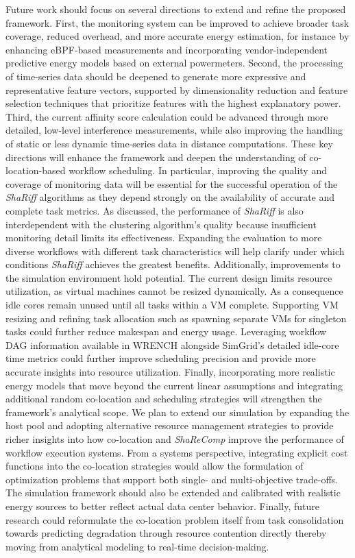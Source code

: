 Future work should focus on several directions to extend and refine the proposed framework. First, the monitoring system can be improved to achieve broader task coverage, reduced overhead, and more accurate energy estimation, for instance by enhancing eBPF-based measurements and incorporating vendor-independent predictive energy models based on external powermeters. Second, the processing of time-series data should be deepened to generate more expressive and representative feature vectors, supported by dimensionality reduction and feature selection techniques that prioritize features with the highest explanatory power.
Third, the current affinity score calculation could be advanced through more detailed, low-level interference measurements, while also improving the handling of static or less dynamic time-series data in distance computations.
These key directions will enhance the framework and deepen the understanding of co-location-based workflow scheduling. In particular, improving the quality and coverage of monitoring data will be essential for the successful operation of the \textit{ShaRiff} algorithms as they depend strongly on the availability of accurate and complete task metrics. As discussed, the performance of \textit{ShaRiff} is also interdependent with the clustering algorithm's quality because insufficient monitoring detail limits its effectiveness. Expanding the evaluation to more diverse workflows with different task characteristics will help clarify under which conditions \textit{ShaRiff} achieves the greatest benefits.
Additionally, improvements to the simulation environment hold potential. The current design limits resource utilization, as virtual machines cannot be resized dynamically. As a consequence idle cores remain unused until all tasks within a VM complete. Supporting VM resizing and refining task allocation such as spawning separate VMs for singleton tasks could further reduce makespan and energy usage. Leveraging workflow DAG information available in WRENCH alongside SimGrid's detailed idle-core time metrics could further improve scheduling precision and provide more accurate insights into resource utilization.
Finally, incorporating more realistic energy models that move beyond the current linear assumptions and integrating additional random co-location and scheduling strategies will strengthen the framework's analytical scope. We plan to extend our simulation by expanding the host pool and adopting alternative resource management strategies to provide richer insights into how co-location and \textit{ShaReComp} improve the performance of workflow execution systems.
From a systems perspective, integrating explicit cost functions into the co-location strategies would allow the formulation of optimization problems that support both single- and multi-objective trade-offs. The simulation framework should also be extended and calibrated with realistic energy sources to better reflect actual data center behavior. Finally, future research could reformulate the co-location problem itself from task consolidation towards predicting degradation through resource contention directly thereby moving from analytical modeling to real-time decision-making.

